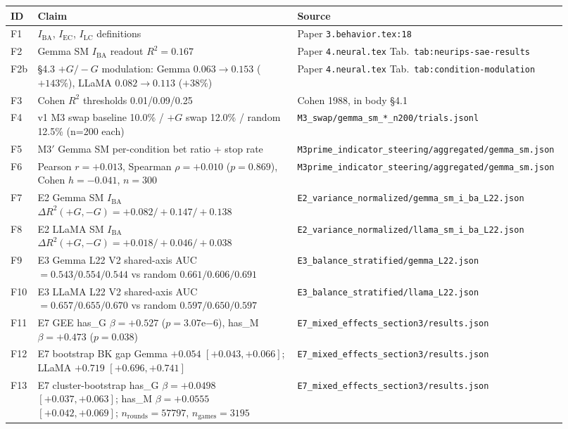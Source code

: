 \documentclass[11pt,a4paper]{article}
\begin{document}
\begin{longtable}{p{0.04\linewidth} p{0.46\linewidth} p{0.42\linewidth}}
\toprule
\textbf{ID} & \textbf{Claim} & \textbf{Source} \\
\midrule
\endfirsthead

F1 & $I_\text{BA}$, $I_\text{EC}$, $I_\text{LC}$ definitions & Paper \texttt{3.behavior.tex:18} \\
F2 & Gemma SM $I_\text{BA}$ readout $R^2 = 0.167$ & Paper \texttt{4.neural.tex} Tab.~\texttt{tab:neurips-sae-results} \\
F2b & \S4.3 $+G/-G$ modulation: Gemma $0.063 \to 0.153$ ($+143\%$), LLaMA $0.082 \to 0.113$ ($+38\%$) & Paper \texttt{4.neural.tex} Tab.~\texttt{tab:condition-modulation} \\
F3 & Cohen $R^2$ thresholds 0.01/0.09/0.25 & Cohen 1988, in body \S4.1 \\
F4 & v1 M3 swap baseline 10.0\% / $+G$ swap 12.0\% / random 12.5\% (n=200 each) & \texttt{M3\_swap/gemma\_sm\_*\_n200/trials.jsonl} \\
F5 & M3$'$ Gemma SM per-condition bet ratio + stop rate & \texttt{M3prime\_indicator\_steering/aggregated/gemma\_sm.json} \\
F6 & Pearson $r=+0.013$, Spearman $\rho=+0.010$ ($p=0.869$), Cohen $h=-0.041$, $n=300$ & \texttt{M3prime\_indicator\_steering/aggregated/gemma\_sm.json} \\
F7 & E2 Gemma SM $I_\text{BA}$ $\Delta R^2(+G,-G) = +0.082 / +0.147 / +0.138$ & \texttt{E2\_variance\_normalized/gemma\_sm\_i\_ba\_L22.json} \\
F8 & E2 LLaMA SM $I_\text{BA}$ $\Delta R^2(+G,-G) = +0.018 / +0.046 / +0.038$ & \texttt{E2\_variance\_normalized/llama\_sm\_i\_ba\_L22.json} \\
F9 & E3 Gemma L22 V2 shared-axis AUC $= 0.543 / 0.554 / 0.544$ vs random $0.661 / 0.606 / 0.691$ & \texttt{E3\_balance\_stratified/gemma\_L22.json} \\
F10 & E3 LLaMA L22 V2 shared-axis AUC $= 0.657 / 0.655 / 0.670$ vs random $0.597 / 0.650 / 0.597$ & \texttt{E3\_balance\_stratified/llama\_L22.json} \\
F11 & E7 GEE has\_G $\beta=+0.527$ ($p=3.07\mathrm{e}{-6}$), has\_M $\beta=+0.473$ ($p=0.038$) & \texttt{E7\_mixed\_effects\_section3/results.json} \\
F12 & E7 bootstrap BK gap Gemma $+0.054$ $[+0.043, +0.066]$; LLaMA $+0.719$ $[+0.696, +0.741]$ & \texttt{E7\_mixed\_effects\_section3/results.json} \\
F13 & E7 cluster-bootstrap has\_G $\beta=+0.0498$ $[+0.037, +0.063]$; has\_M $\beta=+0.0555$ $[+0.042, +0.069]$; $n_\text{rounds}=57797$, $n_\text{games}=3195$ & \texttt{E7\_mixed\_effects\_section3/results.json} \\

\end{longtable}
\end{document}
